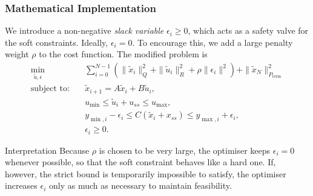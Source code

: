 \subsubsection*{Mathematical Implementation}
We introduce a non-negative \emph{slack variable} \(\epsilon_i \ge 0\), which acts as a safety valve for the soft constraints. Ideally, \(\epsilon_i=0\). To encourage this, we add a large penalty weight \(\rho\) to the cost function. The modified problem is
\begin{align*}
	\min_{\tilde u,\epsilon} \quad &
	\sum_{i=0}^{N-1}
	\left(
	\|\tilde x_i\|_Q^2 + \|\tilde u_i\|_R^2 + \rho\|\epsilon_i\|^2
	\right)
	+ \|\tilde x_N\|_{P_{\mathrm{term}}}^2 \\
	\text{subject to:} \quad &
	\tilde x_{i+1} = A\tilde x_i + B\tilde u_i, \\
	&
	u_{\min} \le \tilde u_i + u_{ss} \le u_{\max}, \\
	&
	y_{\min,i} - \epsilon_i
	\le
	C(\tilde x_i + x_{ss})
	\le
	y_{\max,i} + \epsilon_i, \\
	&
	\epsilon_i \ge 0.
\end{align*}

\begin{notebox}{Interpretation}
	Because \(\rho\) is chosen to be very large, the optimiser keeps \(\epsilon_i = 0\) whenever possible, so that the soft constraint behaves like a hard one. If, however, the strict bound is temporarily impossible to satisfy, the optimiser increases \(\epsilon_i\) only as much as necessary to maintain feasibility.
\end{notebox}

